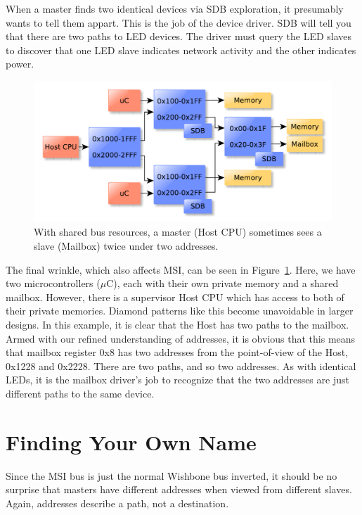 \documentclass[a4paper]{jacow}
\begin{document}
When a master finds two identical devices via SDB exploration,
it presumably wants to tell them appart.
This is the job of the device driver.
SDB will tell you that there are two paths to LED devices.
The driver must query the LED slaves to discover that one LED slave
indicates network activity and the other indicates power.

\begin{figure}[t]
  \centering
  \includegraphics*[width=\columnwidth]{diamond-bus}
  \caption{With shared bus resources, a master (Host CPU)
  sometimes sees a slave (Mailbox) twice under two addresses.}
  \label{fig:diamond-bus}
\end{figure}

The final wrinkle, which also affects MSI, can be seen in
Figure~\ref{fig:diamond-bus}.
Here, we have two microcontrollers ($\mu$C), each with their own private
memory and a shared mailbox.
However, there is a supervisor Host CPU which has access to both of their
private memories.
Diamond patterns like this become unavoidable in larger designs.
In this example, it is clear that the Host has two paths to the mailbox.
Armed with our refined understanding of addresses, 
it is obvious that this means that mailbox register 0x8 has two addresses
from the point-of-view of the Host, 0x1228 and 0x2228.
There are two paths, and so two addresses.
As with identical LEDs, it is the mailbox driver's job to recognize that the
two addresses are just different paths to the same device.

\section{Finding Your Own Name}

Since the MSI bus is just the normal Wishbone bus inverted,
it should be no surprise that masters have different addresses when
viewed from different slaves.
Again, addresses describe a path, not a destination.
\end{document}
